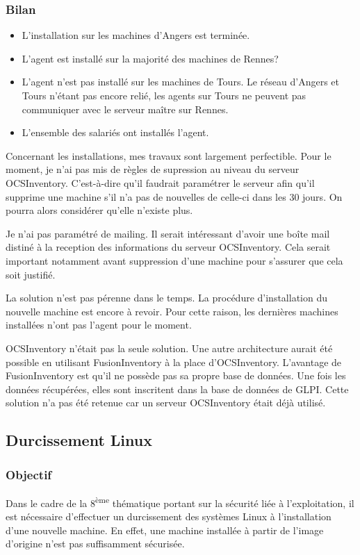 \documentclass[12pt]{article}
\begin{document}
\newpage
\subsubsection{Bilan}
\begin{itemize}
    \item L'installation sur les machines d'Angers est terminée.
    \item L'agent est installé sur la majorité des machines de Rennes?
    \item L'agent n'est pas installé sur les machines de Tours. 
    Le réseau d'Angers et Tours n'étant pas encore relié, les agents sur Tours ne peuvent pas communiquer avec le serveur maître sur Rennes.
    \item L'ensemble des salariés ont installés l'agent.
\end{itemize}

Concernant les installations, mes travaux sont largement perfectible.
Pour le moment, je n'ai pas mis de règles de supression au niveau du serveur \gls{OCSInventory}.
C'est-à-dire qu'il faudrait paramétrer le serveur afin qu'il supprime une machine s'il n'a pas de nouvelles de celle-ci dans les 30 jours.
On pourra alors considérer qu'elle n'existe plus.

Je n'ai pas paramétré de mailing.
Il serait intéressant d'avoir une boîte mail distiné à la reception des informations du serveur \gls{OCSInventory}.
Cela serait important notamment avant suppression d'une machine pour s'assurer que cela soit justifié.

La solution n'est pas pérenne dans le temps.
La procédure d'installation du nouvelle machine est encore à revoir.
Pour cette raison, les dernières machines installées n'ont pas l'agent pour le moment.

\gls{OCSInventory} n'était pas la seule solution.
Une autre architecture aurait été possible en utilisant FusionInventory à la place d'\gls{OCSInventory}. 
L'avantage de FusionInventory est qu'il ne possède pas sa propre base de données. 
Une fois les données récupérées, elles sont inscritent dans la base de données de \gls{GLPI}. 
Cette solution n'a pas été retenue car un serveur \gls{OCSInventory} était déjà utilisé.

\newpage
\subsection{Durcissement \gls{Linux}}
\subsubsection{Objectif}
Dans le cadre de la 8\textsuperscript{ème} thématique portant sur la sécurité liée à l'exploitation, il est nécessaire d'effectuer un durcissement des systèmes \gls{Linux} à l'installation d'une nouvelle machine. 
En effet, une machine installée à partir de l'image d'origine n'est pas suffisamment sécurisée.
\end{document}
